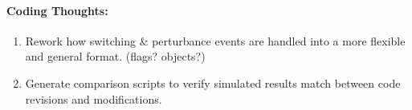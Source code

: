 \documentclass[12pt]{article}
\begin{document}
\begin{multicols}{2}
	
	\paragraph{Coding Thoughts:} 
		\begin{enumerate}
	
			\itemsep 0em 
			\item Rework how switching \& perturbance events are handled into a more flexible and general format. (flags? objects?)
			\item Generate comparison scripts to verify simulated results match  between code revisions and modifications.
			
	
		\end{enumerate}
		
\vfill\null

\end{multicols}
\end{document}
